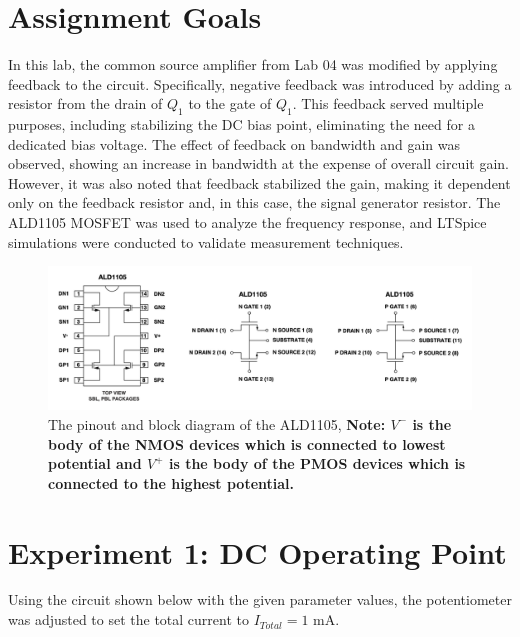 

\section{Assignment Goals}

\singlespacing
\justifying 
\par
In this lab, the common source amplifier from Lab 04 was modified by applying feedback to the circuit. Specifically, negative feedback was introduced by adding a resistor from the drain of $Q_{1}$ to the gate of $Q_{1}$. This feedback served multiple purposes, including stabilizing the DC bias point, eliminating the need for a dedicated bias voltage. The effect of feedback on bandwidth and gain was observed, showing an increase in bandwidth at the expense of overall circuit gain. However, it was also noted that feedback stabilized the gain, making it dependent only on the feedback resistor and, in this case, the signal generator resistor. The ALD1105 MOSFET was used to analyze the frequency response, and LTSpice simulations were conducted to validate measurement techniques.

\begin{center}
\begin{figure}[ht]
\includegraphics[scale=0.5]{Chapter_5/Lab_05_Image_1.png}
\caption{The pinout and block diagram of the ALD1105, \textbf{Note: $V^{-}$ is the body of the NMOS devices which is connected to lowest potential and $V^{+}$ is the body of the PMOS devices which is connected to the highest potential. }}
\label{fig:1}
\end{figure}
\end{center}

\section{Experiment 1: DC Operating Point}

Using the circuit shown below with the given parameter values, the potentiometer was adjusted to set the total current to $I_{Total} = 1$ mA.

